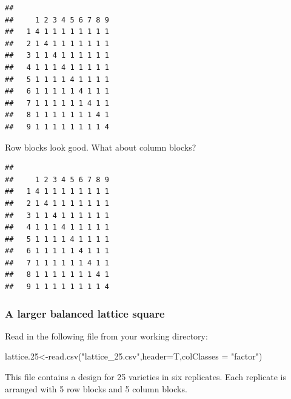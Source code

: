 \documentclass[
]{book}
\newenvironment{Shaded}{\begin{snugshade}}{\end{snugshade}}
\newcommand{\AttributeTok}[1]{\textcolor[rgb]{0.77,0.63,0.00}{#1}}
\newcommand{\FloatTok}[1]{\textcolor[rgb]{0.00,0.00,0.81}{#1}}
\newcommand{\FunctionTok}[1]{\textcolor[rgb]{0.00,0.00,0.00}{#1}}
\newcommand{\NormalTok}[1]{#1}
\newcommand{\OtherTok}[1]{\textcolor[rgb]{0.56,0.35,0.01}{#1}}
\newcommand{\SpecialCharTok}[1]{\textcolor[rgb]{0.00,0.00,0.00}{#1}}
\newcommand{\StringTok}[1]{\textcolor[rgb]{0.31,0.60,0.02}{#1}}
\begin{document}
\begin{verbatim}
##    
##     1 2 3 4 5 6 7 8 9
##   1 4 1 1 1 1 1 1 1 1
##   2 1 4 1 1 1 1 1 1 1
##   3 1 1 4 1 1 1 1 1 1
##   4 1 1 1 4 1 1 1 1 1
##   5 1 1 1 1 4 1 1 1 1
##   6 1 1 1 1 1 4 1 1 1
##   7 1 1 1 1 1 1 4 1 1
##   8 1 1 1 1 1 1 1 4 1
##   9 1 1 1 1 1 1 1 1 4
\end{verbatim}

Row blocks look good. What about column blocks?

\begin{Shaded}
\end{Shaded}

\begin{verbatim}
##    
##     1 2 3 4 5 6 7 8 9
##   1 4 1 1 1 1 1 1 1 1
##   2 1 4 1 1 1 1 1 1 1
##   3 1 1 4 1 1 1 1 1 1
##   4 1 1 1 4 1 1 1 1 1
##   5 1 1 1 1 4 1 1 1 1
##   6 1 1 1 1 1 4 1 1 1
##   7 1 1 1 1 1 1 4 1 1
##   8 1 1 1 1 1 1 1 4 1
##   9 1 1 1 1 1 1 1 1 4
\end{verbatim}

\hypertarget{a-larger-balanced-lattice-square}{%
\subsubsection{A larger balanced lattice square}\label{a-larger-balanced-lattice-square}}

Read in the following file from your working directory:

\begin{Shaded}
\begin{Highlighting}[]
\NormalTok{lattice}\FloatTok{.25}\OtherTok{\textless{}{-}}\FunctionTok{read.csv}\NormalTok{(}\StringTok{"lattice\_25.csv"}\NormalTok{,}\AttributeTok{header=}\NormalTok{T,}\AttributeTok{colClasses =} \StringTok{"factor"}\NormalTok{)}
\end{Highlighting}
\end{Shaded}

This file contains a design for 25 varieties in six replicates. Each replicate is arranged with 5 row blocks and 5 column blocks.
\end{document}
